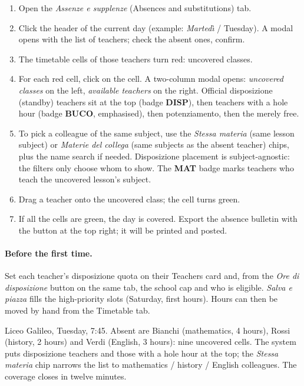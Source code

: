 \begin{enumerate}
\item Open the \emph{Assenze e supplenze} (Absences and
  substitutions) tab.
\item Click the header of the current day (example:
  \emph{Marted\`{\i}} / Tuesday). A modal opens with the list of
  teachers; check the absent ones, confirm.
\item The timetable cells of those teachers turn red: uncovered
  classes.
\item For each red cell, click on the cell. A two-column modal
  opens: \emph{uncovered classes} on the left,
  \emph{available teachers} on the right. Official disposizione
  (standby) teachers sit at the top (badge \textbf{DISP}), then
  teachers with a hole hour (badge \textbf{BUCO}, emphasised),
  then potenziamento, then the merely free.
\item To pick a colleague of the same subject, use the
  \emph{Stessa materia} (same lesson subject) or \emph{Materie
  del collega} (same subjects as the absent teacher) chips,
  plus the name search if needed. Disposizione placement is
  subject-agnostic: the filters only choose whom to show. The
  \textbf{MAT} badge marks teachers who teach the uncovered
  lesson's subject.
\item Drag a teacher onto the uncovered class; the cell turns
  green.
\item If all the cells are green, the day is covered. Export the
  absence bulletin with the button at the top right; it will be
  printed and posted.
\end{enumerate}

\paragraph{Before the first time.} Set each teacher's
disposizione quota on their Teachers card and, from the
\emph{Ore di disposizione} button on the same tab, the school
cap and who is eligible. \emph{Salva e piazza} fills the
high-priority slots (Saturday, first hours). Hours can then
be moved by hand from the Timetable tab.

\begin{esempiobox}[title=Real case]
Liceo Galileo, Tuesday, 7:45. Absent are Bianchi (mathematics,
4 hours), Rossi (history, 2 hours) and Verdi (English, 3 hours):
nine uncovered cells. The system puts disposizione teachers and
those with a hole hour at the top; the \emph{Stessa materia}
chip narrows the list to mathematics / history / English
colleagues. The coverage closes in twelve minutes.
\end{esempiobox}

